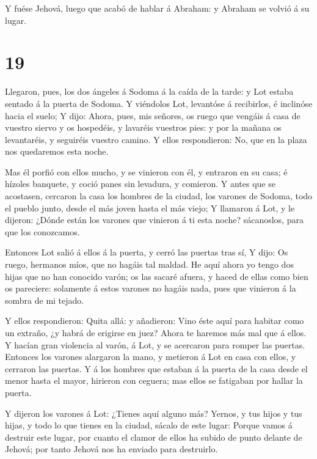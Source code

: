  Y fuése Jehová, luego que acabó de hablar á Abraham: y
Abraham se volvió á su lugar.

\hypertarget{section-18}{%
\section{19}\label{section-18}}

 Llegaron, pues, los dos ángeles á Sodoma á la caída de la
tarde: y Lot estaba sentado á la puerta de Sodoma. Y viéndolos Lot,
levantóse á recibirlos, é inclinóse hacia el suelo;  Y dijo:
Ahora, pues, mis señores, os ruego que vengáis á casa de vuestro siervo
y os hospedéis, y lavaréis vuestros pies: y por la mañana os
levantaréis, y seguiréis vuestro camino. Y ellos respondieron: No, que
en la plaza nos quedaremos esta noche.

 Mas él porfió con ellos mucho, y se vinieron con él, y
entraron en su casa; é hízoles banquete, y coció panes sin levadura, y
comieron.  Y antes que se acostasen, cercaron la casa los
hombres de la ciudad, los varones de Sodoma, todo el pueblo junto, desde
el más joven hasta el más viejo;  Y llamaron á Lot, y le
dijeron: ¿Dónde están los varones que vinieron á ti esta noche?
sácanoslos, para que los conozcamos.

 Entonces Lot salió á ellos á la puerta, y cerró las puertas
tras sí,  Y dijo: Os ruego, hermanos míos, que no hagáis tal
maldad.  He aquí ahora yo tengo dos hijas que no han
conocido varón; os las sacaré afuera, y haced de ellas como bien os
pareciere: solamente á estos varones no hagáis nada, pues que vinieron á
la sombra de mi tejado.

 Y ellos respondieron: Quita allá: y añadieron: Vino éste
aquí para habitar como un extraño, ¿y habrá de erigirse en juez? Ahora
te haremos más mal que á ellos. Y hacían gran violencia al varón, á Lot,
y se acercaron para romper las puertas.  Entonces los
varones alargaron la mano, y metieron á Lot en casa con ellos, y
cerraron las puertas.  Y á los hombres que estaban á la
puerta de la casa desde el menor hasta el mayor, hirieron con ceguera;
mas ellos se fatigaban por hallar la puerta.

 Y dijeron los varones á Lot: ¿Tienes aquí alguno más?
Yernos, y tus hijos y tus hijas, y todo lo que tienes en la ciudad,
sácalo de este lugar:  Porque vamos á destruir este lugar,
por cuanto el clamor de ellos ha subido de punto delante de Jehová; por
tanto Jehová nos ha enviado para destruirlo.

